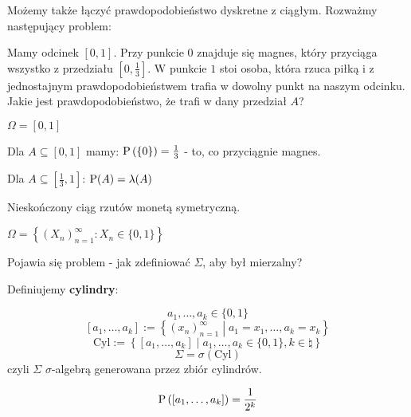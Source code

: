 \begin{example}

    Możemy także łączyć prawdopodobieństwo dyskretne z ciągłym. Rozważmy następujący problem:

    Mamy odcinek \( [0, 1] \). Przy punkcie \( 0 \) znajduje się magnes, który przyciąga wszystko z przedziału \( [0, \frac{1}{3}] \). W punkcie \( 1 \) stoi osoba, która rzuca piłką i z jednostajnym prawdopodobieństwem trafia w dowolny punkt na naszym odcinku. Jakie jest prawdopodobieństwo, że trafi w dany przedział \( A \)?

    \( \Omega = [0, 1] \)

    Dla \( A \subseteq [0, 1] \) mamy: \( \operatorname{P}\left(\{0\}\right) = \frac{1}{3} \) - to, co przyciągnie magnes.

    Dla \( A \subseteq [\frac{1}{3}, 1] \): \( \operatorname{P}(A) = \lambda(A) \)

\end{example}

\begin{example}
    Nieskończony ciąg rzutów monetą symetryczną.

    \( \Omega = \left\{ (X_n)_{n = 1}^{\infty} : X_n \in \{0, 1\} \right\} \)

    Pojawia się problem - jak zdefiniować \( \Sigma \), aby był mierzalny?

    Definiujemy \textbf{cylindry}:

    \[ 
        a_1, \ldots, a_k \in \{0, 1\} 
    \]
    \[ 
        [a_1, \ldots, a_k] := \left\{ (x_n)_{n=1}^{\infty} \middle| a_1 = x_1, \ldots, a_k = x_k \right\} 
    \]
    \[ 
        \text{Cyl} := \left\{ [a_1, \ldots, a_k] \middle| a_1, \ldots, a_k \in \{0, 1\}, k \in \natural \right\} 
    \]
    \[ 
        \Sigma = \sigma\left( \text{Cyl} \right) 
    \] 
    czyli \( \Sigma \) \( \sigma \)-algebrą generowana przez zbiór cylindrów.

    \[ 
        \operatorname{P}\left( [a_1, \ldots, a_k] \right) = \frac{1}{2^k} 
    \]
\end{example}
